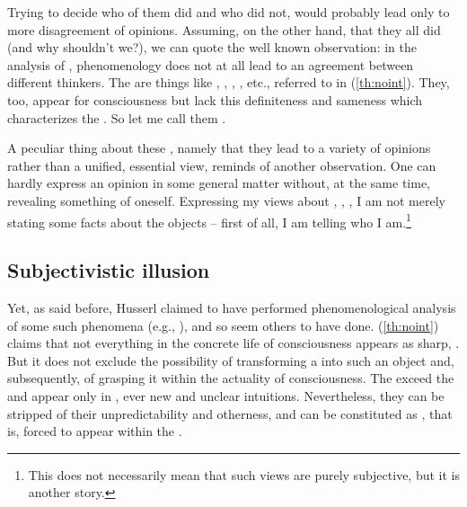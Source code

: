 Trying to decide who of them did and who did not, 
would probably lead only to more 
disagreement of opinions. Assuming, on the other hand, that they all 
did  (and why shouldn't we?), we can quote the well known observation:
in the analysis of , phenomenology 
does not at all lead to an agreement between different 
thinkers.
The  are things like , 
, , , etc., referred to in (\ref{th:noint}). 
They, too, appear for 
consciousness but lack this definiteness and sameness which characterizes the 
. So let me call them . 
%

A peculiar thing about these , namely that 
they lead to a variety of 
opinions rather than a unified, essential view, reminds of another 
observation. One can hardly express an opinion in some 
general matter without, at the same time, revealing something of 
oneself. Expressing my views about , , , I am not merely stating some facts about the 
objects -- first of all, I am telling who I am.\footnote{This does not 
necessarily mean that such views are purely subjective, but it is another story.}

\subsection{Subjectivistic illusion}

Yet, as said before, Husserl claimed to have performed 
phenomenological analysis of some such phenomena (e.g., ), 
and so seem others 
to have done. (\ref{th:noint}) claims that not everything in the 
concrete life of consciousness appears as sharp, . 
But it does not exclude the possibility of transforming a 
into such an object and, subsequently, of grasping it within the actuality of 
consciousness.
The  exceed the  
and appear only in , ever new and unclear
intuitions. Nevertheless, they can be stripped of their unpredictability 
and otherness, and can be constituted as , that 
is, forced to appear within the . 

